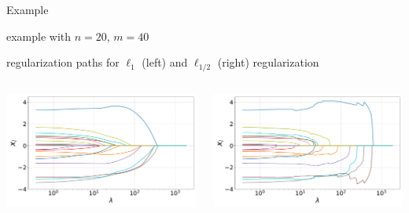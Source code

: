 \documentclass[aspectratio=169,11pt]{beamer}
\begin{document}
\begin{frame}{Example}
\BIT
\item example with $n = 20$, $m = 40$
\item regularization paths for $\ell_1$ (left) and $\ell_{1/2}$ (right) regularization 
\EIT

\vfill

\begin{columns}
\begin{column}{0.5\textwidth}
\centering
\includegraphics[width=\textwidth]{lasso_reg_path_larger.pdf}
\end{column}
\begin{column}{0.5\textwidth}
\centering
\includegraphics[width=\textwidth]{ell_half_reg_path_larger.pdf}
\end{column}
\end{columns}
\vfill\centering
\end{frame}
\end{document}
